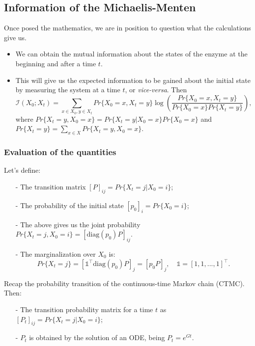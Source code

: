 \documentclass[11pt]{amsart}
\begin{document}
\subsection{Information of the Michaelis-Menten}
Once posed the mathematics, we are in position to question what the calculations give us.
\begin{itemize}
\item We can obtain the mutual information about the states of the enzyme at the beginning and after a time $t$.
\item This will give us the expected information to be gained about the initial state by measuring the system at a time $t$, or {\it vice-versa}. Then
$$\mathcal{I}(X_0;X_t) = \sum_{x \in X_0, y \in X_t} Pr\{X_0=x, X_t=y\} \log \left( \frac{Pr\{X_0\!=\!x, X_t\!=\!y\}}{Pr\{X_0\!=\!x\}Pr\{X_t\!=\!y\}} \right),$$
where $Pr\{X_t\! =\!y , X_0\! = \!x\} = Pr\{X_t\! =\!y | X_0\!=\!x\}Pr\{X_0\!=\!x\}$ and $Pr\{X_t\! =\!y\} = \sum_{x \in X} Pr\{X_t\!=\!y , X_0=x\} $.
\end{itemize}

\subsubsection{Evaluation of the quantities}
Let's define:

\begin{itemize}
\item[-] The transition matrix $\left[P\right]_{ij} = Pr\{X_t\! =\!j | X_0\! = \!i\}$;
\item[-] The probability of the initial state $\left[p_0\right]_i =  Pr\{ X_0\! = \!i\}$;
\item[-] The above gives us the joint probability $Pr\{X_t\! =\!j , X_0\! = \!i\}=\left[\text{diag}(p_0)P\right]_{ij}$.
\item[-] The marginalization over $X_0$ is:
$$ Pr\{X_t = j\} = \left[\mathbb{1}^\top \text{diag}(p_0)P\right]_j = \left[p_0P\right]_j, \quad \mathbb{1} = [1, 1, ..., 1]^\top.$$
\end{itemize}

Recap the probability transition of the continuous-time Markov chain (CTMC). Then:
\begin{itemize}
\item[-] The transition probability matrix for a time $t$ as $\left[P_t\right]_{ij} = Pr\{X_t\! =\!j | X_0\! = \!i\}$;
\item[-] $P_t$ is obtained by the solution of an ODE, being $P_t = e^{Gt}$.
\end{itemize}
\end{document}
